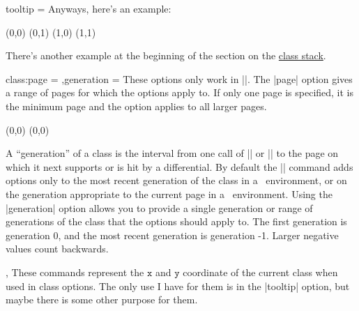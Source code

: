 \begin{sseqdata}[name = basic, cohomological Serre grading]
\begin{key}{tooltip = }
Anyways, here's an example:
\begin{codeexample}[]
\begin{sseqpage}[classes = {tooltip = {(\xcoord,\ycoord)}}]
\class(0,0)
\class(0,1)
\class(1,0)
\class(1,1)
\end{sseqpage}
\end{codeexample}

There's another example at the beginning of the section on the \hyperref[sec:class stack]{class stack}.
\end{key}

\begin{keylist}{class:page = ,generation = }
\def\classpagehandler#1#2{\textcolor{keycolor}{\noligs{#2}}}
These options only work in |\classoptions|. The |page| option gives a range of pages for which the options apply to. If only one page is specified, it is the minimum page and the option applies to all larger pages.
\begin{codeexample}[width = 6cm]
\begin{sseqdata}[ name = page_example, no axes,
    title = \page, title style = {yshift = -0.5cm} ]
\class(0,0)
\classoptions[class:page = 2 -- 3, fill, blue](0,0)
\end{sseqdata}

\printpage[ name = page_example, page = 1 ] \qquad
\printpage[ name = page_example, page = 2 ] \qquad
\printpage[ name = page_example, page = 4 ]
\end{codeexample}
A ``generation'' of a class is the interval from one call of |\class| or |\replaceclass| to the page on which it next supports or is hit by a differential.
By default the |\classoptions| command adds options only to the most recent generation of the class in a \sseqdataenv\  environment, or on the generation appropriate to the current page in a \sseqpageenv\  environment. Using the |generation| option allows you to provide a single generation or range of generations of the class that the options should apply to. The first generation is generation 0, and the most recent generation is generation -1. Larger negative values count backwards.
\codeexample[from file=class-page2a]
\codeexample[from file=class-page2b]
\end{keylist}

\begin{commandlist}{\xcoord,\ycoord}
These commands represent the $\mathtt{x}$ and $\mathtt{y}$ coordinate of the current class when used in class options. The only use I have for them is in the |tooltip| option, but maybe there is some other purpose for them.
\end{commandlist}



\end{sseqdata}

